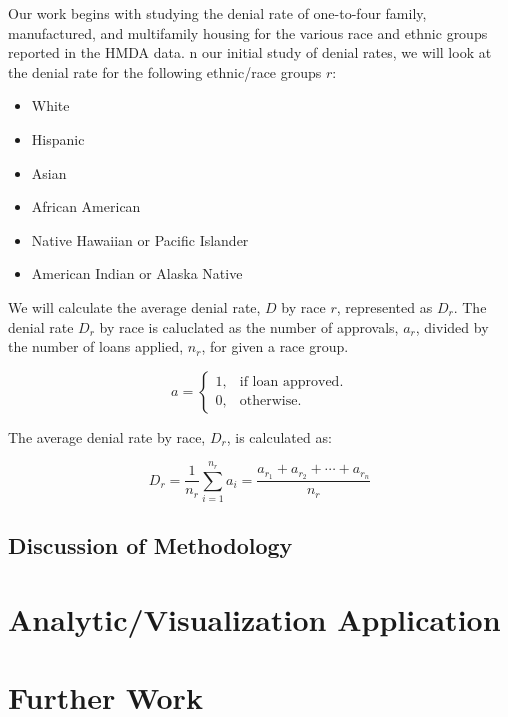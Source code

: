 \documentclass[11pt]{article}
\newcommand{\vertSpace}[1]{\vspace{3mm}}
\begin{document}
{Our work begins with studying the denial rate of one-to-four family, manufactured, and multifamily housing for the various race and ethnic groups reported in the HMDA data.  \vertSpace

In our initial study of denial rates, we will look at the denial rate for the following ethnic/race groups $r$:

\begin{itemize}
  \item White
  \item Hispanic
  \item Asian
  \item African American
  \item Native Hawaiian or Pacific Islander
  \item American Indian or Alaska Native
\end{itemize}

We will calculate the average denial rate, $D$ by race $r$, represented as $D_r$.  The denial rate $D_r$ by race is caluclated as the number of approvals, $a_r$, divided by the number of loans applied, $n_r$, for given a race group.


\begin{equation}
  a=\begin{cases}
    1, & \text{if loan approved}.\\
    0, & \text{otherwise}.
  \end{cases}
\end{equation}

\noindent The average denial rate by race, $D_r$, is calculated as: 

\begin{equation}
D_r={\frac {1}{n_r}}\sum _{i=1}^{n_r}a_{i}={\frac {a_{r_1}+a_{r_2}+\cdots +a_{r_n}}{n_r}}
\end{equation}



\subsection{Discussion of Methodology}




\section{Analytic/Visualization Application}



\section{Further Work}

}
\end{document}
